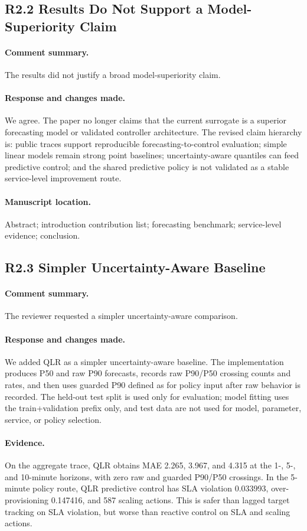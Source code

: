 \documentclass[11pt]{article}
\newcommand{\code}[1]{\texttt{\detokenize{#1}}}
\newcommand{\resp}[3]{\paragraph{Comment summary.} #1\par\paragraph{Response and changes made.} #2\par\paragraph{Manuscript location.} #3\par}
\begin{document}
\subsection*{R2.2 Results Do Not Support a Model-Superiority Claim}
\resp{The results did not justify a broad model-superiority claim.}{We agree. The paper no longer claims that the current surrogate is a superior forecasting model or validated controller architecture. The revised claim hierarchy is: public traces support reproducible forecasting-to-control evaluation; simple linear models remain strong point baselines; uncertainty-aware quantiles can feed predictive control; and the shared predictive policy is not validated as a stable service-level improvement route.}{Abstract; introduction contribution list; forecasting benchmark; service-level evidence; conclusion.}

\subsection*{R2.3 Simpler Uncertainty-Aware Baseline}
\paragraph{Comment summary.} The reviewer requested a simpler uncertainty-aware comparison.
\paragraph{Response and changes made.} We added QLR as a simpler uncertainty-aware baseline. The implementation produces P50 and raw P90 forecasts, records raw P90/P50 crossing counts and rates, and then uses guarded P90 defined as \code{max(raw_p90, p50)} for policy input after raw behavior is recorded. The held-out test split is used only for evaluation; model fitting uses the train+validation prefix only, and test data are not used for model, parameter, service, or policy selection.
\paragraph{Evidence.} On the aggregate trace, QLR obtains MAE 2.265, 3.967, and 4.315 at the 1-, 5-, and 10-minute horizons, with zero raw and guarded P90/P50 crossings. In the 5-minute policy route, QLR predictive control has SLA violation 0.033993, over-provisioning 0.147416, and 587 scaling actions. This is safer than lagged target tracking on SLA violation, but worse than reactive control on SLA and scaling actions.
\end{document}
